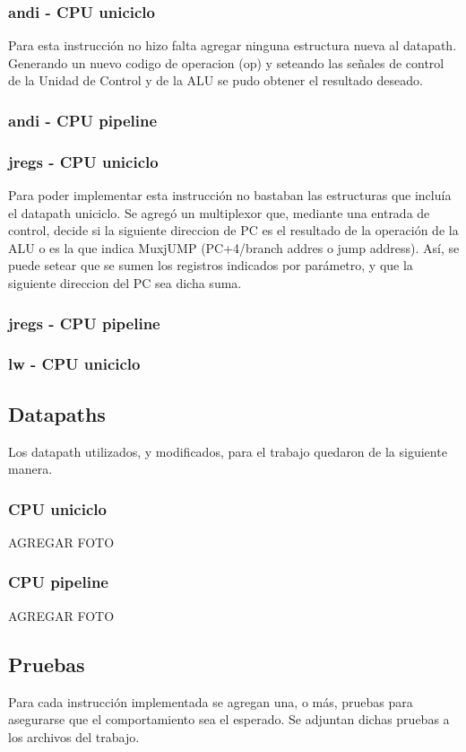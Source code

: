 \documentclass[a4paper, 12pt]{article}
\begin{document}
	\subsubsection{andi - CPU uniciclo}
	Para esta instrucción no hizo falta agregar ninguna estructura nueva al datapath. Generando un nuevo codigo de operacion (op) y seteando las señales de control de la Unidad de Control y de la ALU  se pudo obtener el resultado deseado.
	
	\subsubsection{andi - CPU pipeline}
	
	\subsubsection{jregs - CPU uniciclo}
	Para poder implementar esta instrucción no bastaban las estructuras que incluía el datapath uniciclo.
	Se agregó un multiplexor que, mediante una entrada de control, decide si la siguiente direccion de PC es el resultado de la operación de la ALU o es la que indica MuxjUMP (PC+4/branch addres o jump address). Así, se puede setear que se sumen los registros indicados por parámetro, y que la siguiente direccion del PC sea dicha suma.
	\subsubsection{jregs - CPU pipeline}
	
	\subsubsection{lw - CPU uniciclo}
	
	\subsection{Datapaths}
	Los datapath utilizados, y modificados, para el trabajo quedaron de la siguiente manera.
	\subsubsection{CPU uniciclo}
	AGREGAR FOTO
	\subsubsection{CPU pipeline}
	AGREGAR FOTO
	\subsection{Pruebas}
	Para cada instrucción implementada se agregan una, o más, pruebas para asegurarse que el comportamiento sea el esperado. Se adjuntan dichas pruebas a los archivos del trabajo.
	
\end{document}

